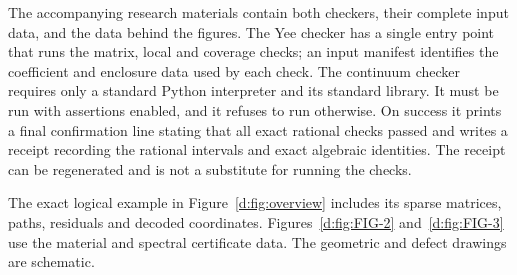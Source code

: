 The accompanying research materials contain both checkers, their
complete input data, and the data behind the figures. The Yee checker
has a single entry point that runs the matrix, local and coverage
checks; an input manifest identifies the coefficient and enclosure data
used by each check. The continuum checker requires only a standard
Python interpreter and its standard library. It must be run with
assertions enabled, and it refuses to run otherwise. On success it
prints a final confirmation line stating that all exact rational checks
passed and writes a receipt recording the rational intervals and exact
algebraic identities. The receipt can be regenerated and is not a
substitute for running the checks.

The exact logical example in Figure~\ref{d:fig:overview} includes its sparse
matrices, paths, residuals and decoded coordinates.
Figures~\ref{d:fig:FIG-2} and~\ref{d:fig:FIG-3} use the material and spectral
certificate data.
The geometric and defect drawings are schematic.
